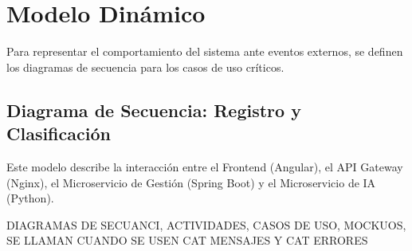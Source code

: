 \section{Modelo Dinámico}
Para representar el comportamiento del sistema ante eventos externos, se definen los diagramas de secuencia para los casos de uso críticos.

\subsection{Diagrama de Secuencia: Registro y Clasificación}
Este modelo describe la interacción entre el Frontend (Angular), el API Gateway (Nginx), el Microservicio de Gestión (Spring Boot) y el Microservicio de IA (Python).


DIAGRAMAS DE  SECUANCI, ACTIVIDADES, CASOS DE USO, MOCKUOS, SE LLAMAN CUANDO SE USEN CAT MENSAJES Y CAT ERRORES